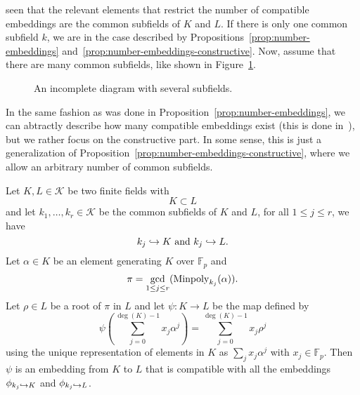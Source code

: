 seen that the relevant elements that restrict the number of compatible
embeddings are the common subfields of $K$ and $L$. If there is only one common
subfield $k$, we are in the case described by
Propositions~\ref{prop:number-embeddings}
and~\ref{prop:number-embeddings-constructive}. Now, assume that there are many
common subfields, like shown in Figure~\ref{fig:incomplete-sev}.%
\begin{figure}
  \centering
  \caption{An incomplete diagram with several subfields.}
  \label{fig:incomplete-sev}
\end{figure}
In the same fashion as was done in Proposition~\ref{prop:number-embeddings}, we
can abtractly describe how many compatible embeddings exist (this is done
in~\cite[Section 2.5]{BCS97}), but we rather focus on the constructive part. In
some sense, this is just a generalization of
Proposition~\ref{prop:number-embeddings-constructive}, where we allow an
arbitrary number of common subfields.
\begin{prop}
  \label{prop:several-subfields}
  Let $K, L\in\mathcal K$ be two finite fields with
  \[
    K\subset L
  \]
  and let $k_1, \dots, k_r\in\mathcal K$ be the common subfields of $K$ and $L$,
  \ie for all $1\leq j\leq r$, we have
  \[
    k_j\hookrightarrow K\text{ and }k_j\hookrightarrow L.
  \]
  Let $\alpha\in K$ be an element generating $K$ over $\mathbb{F}_p$ and
  \[
    \pi = \gcd_{1\leq j\leq r}(\operatorname{Minpoly}_{k_j}(\alpha)).
  \]
  Let $\rho\in L$ be a root of $\pi$ in $L$ and let $\psi:K\to L$ be the map
  defined by
  \[
    \psi\left(\sum_{j=0}^{\deg(K)-1}x_j\alpha^j\right) =
    \sum_{j=0}^{\deg(K)-1}x_j\rho^j
  \]
  using the unique representation of elements in $K$ as $\sum_j x_j\alpha^j$
  with $x_j\in\mathbb{F}_p$. Then $\psi$ is an embedding from $K$ to $L$ that is
  compatible with all the embeddings $\phi_{k_j\hookrightarrow K}$ and $\phi_{k_j\hookrightarrow L}$.
\end{prop}
